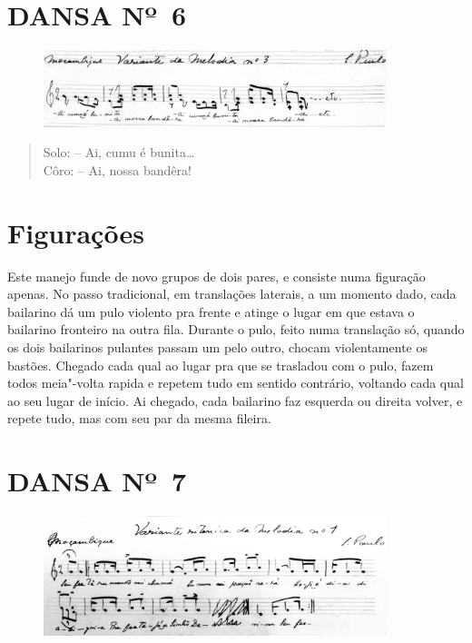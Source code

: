 \pagebreak

\section{DANSA Nº~6}

\begin{figure}[!ht]
\centering
 \includegraphics[width=100mm]{./imgs/img8.jpg}
\end{figure}

\begin{verse}
Solo: -- Ai, cumu é bunita\ldots{}\\
Côro: -- Ai, nossa bandêra!
\end{verse}

\section{Figurações}

Este manejo funde de novo grupos de dois pares, e consiste numa
figuração apenas. No passo tradicional, em translações laterais, a um
momento dado, cada bailarino dá um pulo violento pra frente e atinge o
lugar em que estava o bailarino fronteiro na outra fila. Durante o pulo,
feito numa translação só, quando os dois bailarinos pulantes passam um
pelo outro, chocam violentamente os bastões. Chegado cada qual ao lugar
pra que se trasladou com o pulo, fazem todos meia"-volta rapida e repetem
tudo em sentido contrário, voltando cada qual ao seu lugar de início. Ai
chegado, cada bailarino faz esquerda ou direita volver, e repete tudo,
mas com seu par da mesma fileira.

\pagebreak

\section{DANSA Nº~7}


\begin{figure}[!ht]
\centering
 \includegraphics[width=100mm]{./imgs/img9.jpg}
\end{figure}

